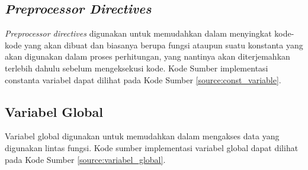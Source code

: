 \subsection{\textit{Preprocessor Directives}}
\textit{Preprocessor directives} digunakan untuk memudahkan dalam menyingkat kode-kode yang akan dibuat dan biasanya berupa fungsi ataupun suatu konstanta yang akan digunakan dalam proses perhitungan, yang nantinya akan diterjemahkan terlebih dahulu sebelum mengeksekusi kode. Kode Sumber implementasi constanta variabel dapat dilihat pada Kode Sumber \ref{source:const_variable}.

\begin{minipage}{\linewidth}

\end{minipage}

\subsection{Variabel Global}
Variabel global digunakan untuk memudahkan dalam mengakses data yang digunakan lintas fungsi. Kode sumber implementasi variabel global dapat dilihat pada Kode Sumber \ref{source:variabel_global}.


\begin{minipage}{\linewidth}

\end{minipage} 

